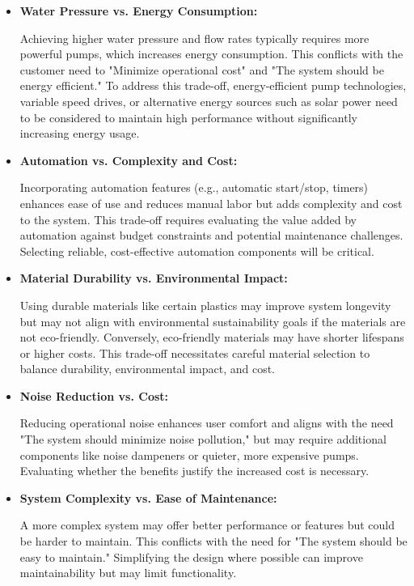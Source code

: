 \documentclass[12pt]{report}
\begin{document}
\begin{itemize}
    \item \textbf{Water Pressure vs. Energy Consumption:}

    Achieving higher water pressure and flow rates typically requires more powerful pumps, which increases energy consumption. This conflicts with the customer need to "Minimize operational cost" and "The system should be energy efficient." To address this trade-off, energy-efficient pump technologies, variable speed drives, or alternative energy sources such as solar power need to be considered to maintain high performance without significantly increasing energy usage.

    \item \textbf{Automation vs. Complexity and Cost:}

    Incorporating automation features (e.g., automatic start/stop, timers) enhances ease of use and reduces manual labor but adds complexity and cost to the system. This trade-off requires evaluating the value added by automation against budget constraints and potential maintenance challenges. Selecting reliable, cost-effective automation components will be critical.

    \item \textbf{Material Durability vs. Environmental Impact:}

    Using durable materials like certain plastics may improve system longevity but may not align with environmental sustainability goals if the materials are not eco-friendly. Conversely, eco-friendly materials may have shorter lifespans or higher costs. This trade-off necessitates careful material selection to balance durability, environmental impact, and cost.

    \item \textbf{Noise Reduction vs. Cost:}

    Reducing operational noise enhances user comfort and aligns with the need "The system should minimize noise pollution," but may require additional components like noise dampeners or quieter, more expensive pumps. Evaluating whether the benefits justify the increased cost is necessary.

    \item \textbf{System Complexity vs. Ease of Maintenance:}

    A more complex system may offer better performance or features but could be harder to maintain. This conflicts with the need for "The system should be easy to maintain." Simplifying the design where possible can improve maintainability but may limit functionality.

\end{itemize}
\end{document}
